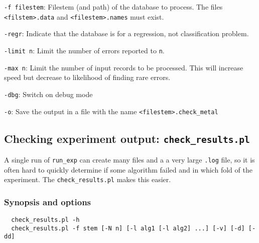 \documentclass[a4paper,10pt,twoside]{article}
\newenvironment{optionlist}
{\begin{list}{}
    {\setlength{\itemsep}{0em plus0em minus0ex}
      \setlength{\parsep}{0ex}
      \setlength{\topsep}{0em}
      \setlength{\leftmargin}{2em}
      \setlength{\listparindent}{0em}
      \setlength{\itemindent}{-2em}
      \setlength{\partopsep}{0ex}
    }}
  {\end{list}}
\begin{document}
\begin{optionlist}
\item \verb=-f filestem=: Filestem (and path) of the database to process.
  The files \verb=<filstem>.data= and \verb=<filestem>.names= must exist.
\item \verb=-regr=: Indicate that the database is for a regression, not
  classification problem.
\item \verb=-limit n=: Limit the number of errors reported to \verb=n=.
\item \verb=-max n=: Limit the number of input records to be processed. This 
will increase speed but decrease to likelihood of finding rare errors.
\item \verb=-dbg=: Switch on debug mode
\item \verb=-o=: Save the output in a file with the name 
  \verb=<filestem>.check_metal=
\end{optionlist}





\subsection{Checking experiment output: \texttt{check\_results.pl}}

A single run of \verb=run_exp= can create many files and 
a a very large \texttt{.log} file, so it is often hard to
quickly determine if some algorithm failed and in which fold
of the experiment. The \texttt{check\_results.pl} makes this easier.

\subsubsection{Synopsis and options}

\begin{verbatim}
  check_results.pl -h
  check_results.pl -f stem [-N n] [-l alg1 [-l alg2] ...] [-v] [-d] [-dd] 
\end{verbatim}
                     
\end{document}
